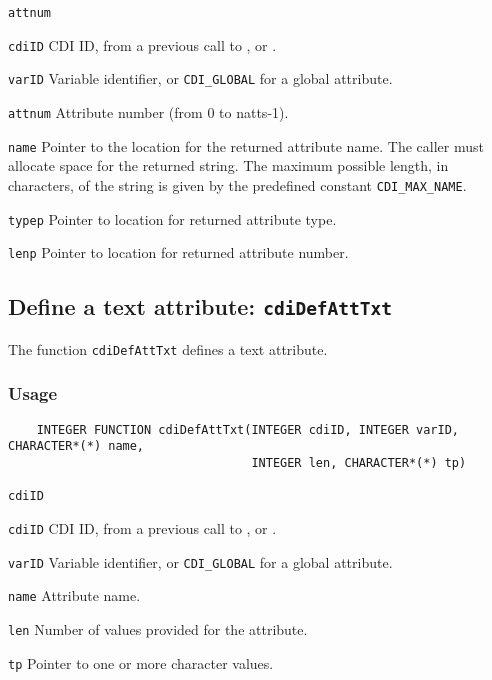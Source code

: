 \hspace*{4mm}\begin{minipage}[]{15cm}
\begin{deflist}{\texttt{attnum}\ }
\item[\texttt{cdiID}]
CDI ID, from a previous call to {}, {} or {}.
\item[\texttt{varID}]
Variable identifier, or {\texttt{CDI\_GLOBAL}} for a global attribute.
\item[\texttt{attnum}]
Attribute number (from 0 to natts-1).
\item[\texttt{name}]
Pointer to the location for the returned attribute name. The caller must allocate space for the
                    returned string. The maximum possible length, in characters, of
                    the string is given by the predefined constant {\texttt{CDI\_MAX\_NAME}}.
\item[\texttt{typep}]
Pointer to location for returned attribute type.
\item[\texttt{lenp}]
Pointer to location for returned attribute number.

\end{deflist}
\end{minipage}


\subsection{Define a text attribute: \texttt{cdiDefAttTxt}}
\label{cdiDefAttTxt}

The function {\texttt{cdiDefAttTxt}} defines a text attribute.

\subsubsection*{Usage}

\begin{verbatim}
    INTEGER FUNCTION cdiDefAttTxt(INTEGER cdiID, INTEGER varID, CHARACTER*(*) name, 
                                  INTEGER len, CHARACTER*(*) tp)
\end{verbatim}

\hspace*{4mm}\begin{minipage}[]{15cm}
\begin{deflist}{\texttt{cdiID}\ }
\item[\texttt{cdiID}]
CDI ID, from a previous call to {}, {} or {}.
\item[\texttt{varID}]
Variable identifier, or {\texttt{CDI\_GLOBAL}} for a global attribute.
\item[\texttt{name}]
Attribute name.
\item[\texttt{len}]
Number of values provided for the attribute.
\item[\texttt{tp}]
Pointer to one or more character values.

\end{deflist}
\end{minipage}

